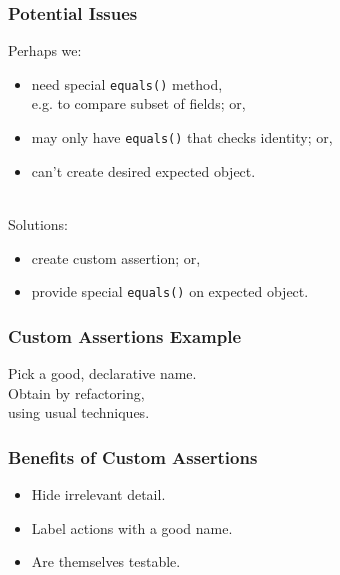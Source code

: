 \documentclass{beamer}
\newenvironment{changemargin}[1]{%
  \begin{list}{}{%
    \setlength{\topsep}{0pt}%
    \setlength{\leftmargin}{#1}%
    \setlength{\rightmargin}{1em}
    \setlength{\listparindent}{\parindent}%
    \setlength{\itemindent}{\parindent}%
    \setlength{\parsep}{\parskip}%
  }%
  \item[]}{\end{list}}
\begin{document}
\begin{frame}
  \frametitle{Potential Issues}
  \Large
  \begin{changemargin}{1.5cm}
    Perhaps we:
    \begin{itemize}
    \item need special {\tt equals()} method, \\
      e.g. to compare subset of fields; or,
    \item may only have {\tt equals()} that checks identity; or,
    \item can't create desired expected object.
    \end{itemize}
    ~\\
    Solutions:
    \begin{itemize}
    \item create custom assertion; or,
    \item provide special {\tt equals()} on expected object.
    \end{itemize}
  \end{changemargin}
\end{frame}

\begin{frame}
  \frametitle{Custom Assertions Example}
  \begin{changemargin}{.5cm}
    \small
    
  \end{changemargin}

  \begin{changemargin}{2cm}
    \Large
    Pick a good, declarative name.\\
    Obtain by refactoring, \\ \hspace*{2cm} using usual techniques.
  \end{changemargin}
\end{frame}

\begin{frame}
  \frametitle{Benefits of Custom Assertions}

  \begin{changemargin}{2cm}
    \Large
    \begin{itemize}
      \item Hide irrelevant detail.
        \item Label actions with a good name.
        \item Are themselves testable.
    \end{itemize}
  \end{changemargin}
\end{frame}
\end{document}
